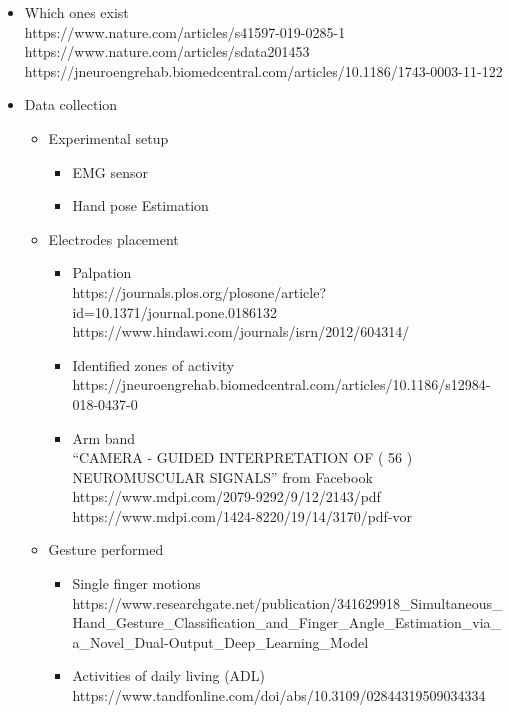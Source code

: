 \documentclass{article}
\begin{document}
\begin{itemize}
    \item Which ones exist \\
    https://www.nature.com/articles/s41597-019-0285-1 \\
    https://www.nature.com/articles/sdata201453 \\
    https://jneuroengrehab.biomedcentral.com/articles/10.1186/1743-0003-11-122
    \item Data collection
    \begin{itemize}
        \item Experimental setup
        \begin{itemize}
            \item EMG sensor
            \item Hand pose Estimation
        \end{itemize}
        \item Electrodes placement
        \begin{itemize}
            \item Palpation\\
            https://journals.plos.org/plosone/article?id=10.1371/journal.pone.0186132\\
            https://www.hindawi.com/journals/isrn/2012/604314/
            \item Identified zones of activity \\
            https://jneuroengrehab.biomedcentral.com/articles/10.1186/s12984-018-0437-0
            \item Arm band \\
            “CAMERA - GUIDED INTERPRETATION OF ( 56 ) NEUROMUSCULAR SIGNALS” from Facebook \\
            https://www.mdpi.com/2079-9292/9/12/2143/pdf \\
            https://www.mdpi.com/1424-8220/19/14/3170/pdf-vor
        \end{itemize}
        \item Gesture performed
        \begin{itemize}
            \item Single finger motions \\
            https://www.researchgate.net/publication/341629918\_Simultaneous\_Hand\_Gesture\_Classification\_and\_Finger\_Angle\_Estimation\_via\_a\_Novel\_Dual-Output\_Deep\_Learning\_Model
            
            \item Activities of daily living (ADL) \\
            https://www.tandfonline.com/doi/abs/10.3109/02844319509034334
            

\end{itemize}
\end{itemize}
\end{itemize}
\end{document}
